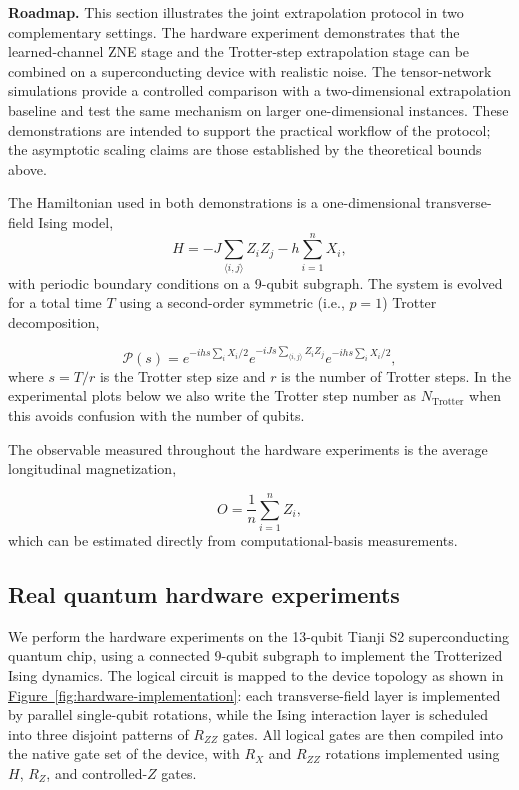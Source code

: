 \documentclass[aps,pra,reprint,groupedaddress,floatfix]{revtex4-2}
\newcommand{\fig}[1]{\hyperref[fig:#1]{Figure~\ref*{fig:#1}}}
\begin{document}
\noindent\textbf{Roadmap.} This section illustrates the joint extrapolation protocol in two complementary settings. The hardware experiment demonstrates that the learned-channel ZNE stage and the Trotter-step extrapolation stage can be combined on a superconducting device with realistic noise. The tensor-network simulations provide a controlled comparison with a two-dimensional extrapolation baseline and test the same mechanism on larger one-dimensional instances. These demonstrations are intended to support the practical workflow of the protocol; the asymptotic scaling claims are those established by the theoretical bounds above.

The Hamiltonian used in both demonstrations is a one-dimensional transverse-field Ising model,
\begin{equation*}
    H = -J \sum_{\langle i,j\rangle} Z_i Z_j - h \sum_{i=1}^{n} X_i,
\end{equation*}
with periodic boundary conditions on a 9-qubit subgraph. The system is evolved for a total time $T$ using a second-order symmetric (i.e., $p=1$) Trotter decomposition,

\begin{equation*}
    \mathcal{P}(s) =
    e^{-i h s \sum_i X_i/2}
    e^{-i J s \sum_{\langle i,j\rangle} Z_i Z_j}
    e^{-i h s \sum_i X_i/2},
\end{equation*}
where $s = T/r$ is the Trotter step size and $r$ is the number of Trotter steps.
In the experimental plots below we also write the Trotter step number as $N_{\mathrm{Trotter}}$ when this avoids confusion with the number of qubits.

The observable measured throughout the hardware experiments is the average longitudinal magnetization,

\begin{equation*}
O=\frac{1}{n} \sum_{i=1}^n Z_i,
\end{equation*}
which can be estimated directly from computational-basis measurements.

\subsection{Real quantum hardware experiments}
We perform the hardware experiments on the 13-qubit Tianji S2 superconducting quantum chip, using a connected 9-qubit subgraph to implement the Trotterized Ising dynamics. The logical circuit is mapped to the device topology as shown in \fig{hardware-implementation}: each transverse-field layer is implemented by parallel single-qubit rotations, while the Ising interaction layer is scheduled into three disjoint patterns of $R_{ZZ}$ gates. All logical gates are then compiled into the native gate set of the device, with $R_X$ and $R_{ZZ}$ rotations implemented using $H$, $R_Z$, and controlled-$Z$ gates.
\end{document}
